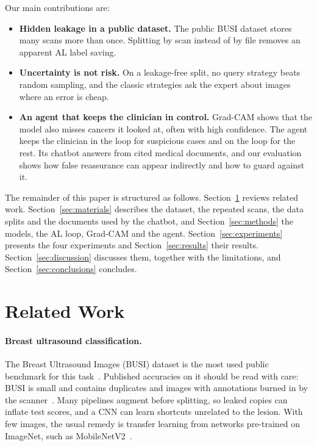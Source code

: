 \documentclass{article}
\begin{document}
Our main contributions are:
\begin{itemize}
\item \textbf{Hidden leakage in a public dataset.} The public BUSI dataset stores many scans
more than once.
Splitting by scan instead of by file removes an apparent AL label saving.
\item \textbf{Uncertainty is not risk.} On a leakage-free split, no query strategy beats
random sampling, and the classic strategies ask the expert about images where an error is
cheap.
\item \textbf{An agent that keeps the clinician in control.} Grad-CAM shows that the model
also misses cancers it looked at, often with high confidence. The agent keeps the clinician
in the loop for suspicious cases and on the loop for the rest. Its chatbot answers from
cited medical documents, and our evaluation shows how false reassurance can appear
indirectly and how to guard against it.
\end{itemize}

The remainder of this paper is structured as follows. Section~\ref{sec:related} reviews
related work. Section~\ref{sec:materials} describes the dataset, the repeated scans, the
data splits and the documents used by the chatbot, and Section~\ref{sec:methods} the models,
the AL loop, Grad-CAM and the agent. Section~\ref{sec:experiments} presents the four
experiments and Section~\ref{sec:results} their results. Section~\ref{sec:discussion}
discusses them, together with the limitations, and Section~\ref{sec:conclusions} concludes.

\section{Related Work}
\label{sec:related}

\paragraph{Breast ultrasound classification.}
The Breast Ultrasound Images (BUSI) dataset is the most used public benchmark for this
task~\cite{aldhabyani2020busi}. Published accuracies on it should be read with care: BUSI is small and contains
duplicates and images with annotations burned in by the scanner~\cite{pawlowska2024curated}.
Many pipelines augment before splitting, so leaked copies can inflate test scores, and a CNN
can learn shortcuts unrelated to the lesion. With few images, the
usual remedy is transfer learning from networks pre-trained on ImageNet, such as
MobileNetV2~\cite{sandler2018mobilenetv2}.
\end{document}

